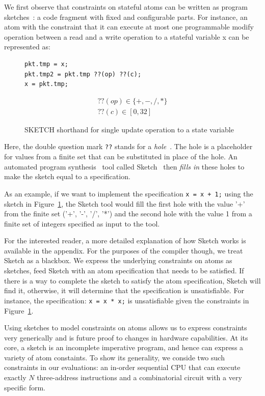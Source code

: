 We first observe that constraints on stateful atoms can be written as program
sketches~\cite{bitstreaming, finite, sketch_manual}: a code fragment with fixed
and configurable parts. For instance, an atom with the constraint that it can
execute at most one programmable modify operation between a read and a write
operation to a stateful variable x can be represented as:
\begin{figure}
  \begin{lstlisting}[style=customc]
pkt.tmp = x;
pkt.tmp2 = pkt.tmp ??(op) ??(c);
x = pkt.tmp;
\end{lstlisting}
\begin{eqnarray*}
  ??(op) \in \{+, -, /, *\} \\
  ??(c)  \in [0, 32]
\end{eqnarray*}
\caption{SKETCH shorthand for single update operation to a state variable}
\label{fig:sketch_for_state}
\end{figure}
Here, the double question mark \texttt{??} stands for a
\textit{hole}~\cite{sketch_manual}. The hole is a placeholder for values from a
finite set that can be substituted in place of the hole. An automated program
synthesis~\cite{synthesis} tool called Sketch~\cite{sketch_manual} then
\textit{fills in} these holes to make the sketch equal to a specification.

As an example, if we want to implement the specification \texttt{x = x + 1;}
using the sketch in Figure~\ref{fig:sketch_for_state}, the Sketch tool would
fill the first hole with the value '+' from the finite set ('+', '-', '/', '*')
and the second hole with the value 1 from a finite set of integers specified as
input to the tool.

For the interested reader, a more detailed explanation of how Sketch works is
available in the appendix. For the purposes of the \pktlanguage compiler
though, we treat Sketch as a blackbox. We express the underlying constraints on
atoms as sketches, feed Sketch with an atom specification that needs to be
satisfied.  If there is a way to complete the sketch to satisfy the atom
specification, Sketch will find it, otherwise, it will determine that the
specification is unsatisfiable. For instance, the specification: \texttt{x = x
* x;} is unsatisfiable given the constraints in
Figure~\ref{fig:sketch_for_state}.

Using sketches to model constraints on atoms allows us to express constraints
very generically and is future proof to changes in hardware capabilities. At
its core, a sketch is an incomplete imperative program, and hence can express a
variety of atom constaints. To show its generality, we conside two such
constraints in our evaluations: an in-order sequential CPU that can execute
exactly $N$ three-address instructions and a combinatorial circuit with a very
specific form.

